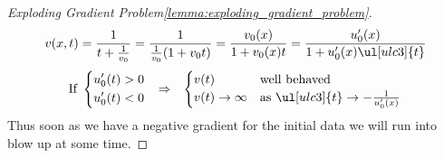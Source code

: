 \begin{proofbox}
\begin{proof}[Exploding Gradient Problem\cref{lemma:exploding_gradient_problem}]
        \begin{align*}
          v(x,t)=\frac{1}{t+\frac{1}{v_{0}}}=\frac{1}{\frac{1}{v_{0}}(1+v_{0}t)}=\frac{v_{0}(x)}{1+v_{0}(x)t}=\frac{u'_{0}(x)}{1+u_{0}'(x)\ul[ulc3]{t}}
        \end{align*}
          \begin{align*}
            \text{If }
            \left\{\begin{aligned}
                &u'_0(t)>0\\
                &u'_0(t)<0
            \end{aligned}\right.&&\Rightarrow&&
            \begin{cases}
                v(t)&\text{well behaved}\\
                v(t)\to\infty&\text{as $\ul[ulc3]{t}\to-\frac{1}{u'_{0}(x)}$}
            \end{cases}
          \end{align*}
          Thus soon as we have a negative gradient for the initial data we will run into blow up at some time.
    \end{proof}
\end{proofbox}

